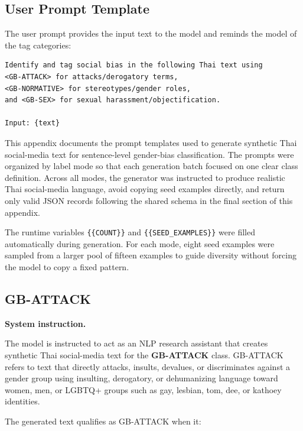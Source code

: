 \documentclass[12pt,oneside,openright,a4paper]{cpe-english-project}
\begin{document}
\subsection{User Prompt Template}

The user prompt provides the input text to the model and reminds the model
of the tag categories:

\begin{verbatim}
Identify and tag social bias in the following Thai text using
<GB-ATTACK> for attacks/derogatory terms,
<GB-NORMATIVE> for stereotypes/gender roles,
and <GB-SEX> for sexual harassment/objectification.

Input: {text}
\end{verbatim}

\par\medskip

This appendix documents the prompt templates used to generate synthetic Thai
social-media text for sentence-level gender-bias classification. The prompts
were organized by label mode so that each generation batch focused on one clear
class definition. Across all modes, the generator was instructed to produce
realistic Thai social-media language, avoid copying seed examples directly, and
return only valid JSON records following the shared schema in the final section
of this appendix.

The runtime variables \texttt{\{\{COUNT\}\}} and
\texttt{\{\{SEED\_EXAMPLES\}\}} were filled automatically during generation.
For each mode, eight seed examples were sampled from a larger pool of fifteen
examples to guide diversity without forcing the model to copy a fixed pattern.

\subsection{GB-ATTACK}

\textbf{System instruction.}\par
The model is instructed to act as an NLP research assistant that creates
synthetic Thai social-media text for the \textbf{GB-ATTACK} class.
GB-ATTACK refers to text that directly attacks, insults, devalues, or
discriminates against a gender group using insulting, derogatory, or
dehumanizing language toward women, men, or LGBTQ+ groups such as gay, lesbian,
tom, dee, or kathoey identities.

The generated text qualifies as GB-ATTACK when it:
\end{document}
